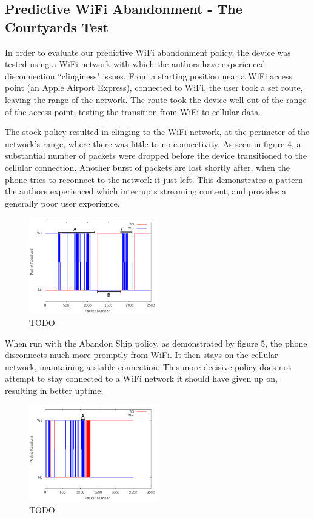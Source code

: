 \subsection{Predictive WiFi Abandonment - The Courtyards Test}
In order to evaluate our predictive WiFi abandonment policy, the device was tested using a WiFi network with which the authors have experienced disconnection ``clinginess" issues. From a starting position near a WiFi access point (an Apple Airport Express), connected to WiFi, the user took a set route, leaving the range of the network. The route took the device well out of the range of the access point, testing the transition from WiFi to cellular data.

The stock policy resulted in clinging to the WiFi network, at the perimeter of the network's range, where there was little to no connectivity. As seen in figure 4, a substantial number of packets were dropped before the device transitioned to the cellular connection. Another burst of packets are lost shortly after, when the phone tries to reconnect to the network it just left. This demonstrates a pattern the authors experienced which interrupts streaming content, and provides a generally poor user experience.

\begin{figure}
	\includegraphics[width=0.5\textwidth]{leavingCourtyardsNoPolicy}
	\caption{TODO}
\end{figure}

When run with the Abandon Ship policy, as demonstrated by figure 5, the phone disconnects much more promptly from WiFi. It then stays on the cellular network, maintaining a stable connection. This more decisive policy does not attempt to stay connected to a WiFi network it should have given up on, resulting in better uptime.

\begin{figure}
	\includegraphics[width=0.5\textwidth]{leavingCourtyardsWithPolicy}
	\caption{TODO}
\end{figure}

